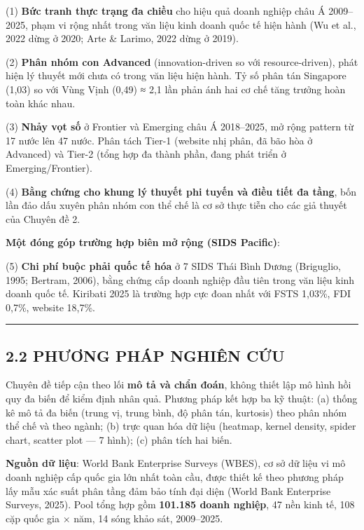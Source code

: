 \documentclass[12pt,a4paper]{article}
\begin{document}
(1) \textbf{Bức tranh thực trạng đa chiều} cho hiệu quả doanh nghiệp
châu Á 2009--2025, phạm vi rộng nhất trong văn liệu kinh doanh quốc tế
hiện hành (Wu et al., 2022 dừng ở 2020; Arte \& Larimo, 2022 dừng ở
2019).

(2) \textbf{Phân nhóm con Advanced} (innovation-driven so với
resource-driven), phát hiện lý thuyết mới chưa có trong văn liệu hiện
hành. Tỷ số phân tán Singapore (1,03) so với Vùng Vịnh (0,49) ≈ 2,1 lần
phản ánh hai cơ chế tăng trưởng hoàn toàn khác nhau.

(3) \textbf{Nhảy vọt số} ở Frontier và Emerging châu Á 2018--2025, mở
rộng pattern từ 17 nước lên 47 nước. Phân tách Tier-1 (website nhị phân,
đã bão hòa ở Advanced) và Tier-2 (tổng hợp đa thành phần, đang phát
triển ở Emerging/Frontier).

(4) \textbf{Bằng chứng cho khung lý thuyết phi tuyến và điều tiết đa
tầng}, bốn lần đảo dấu xuyên phân nhóm con thể chế là cơ sở thực tiễn
cho các giả thuyết của Chuyên đề 2.

\textbf{Một đóng góp trường hợp biên mở rộng (SIDS Pacific)}:

(5) \textbf{Chi phí buộc phải quốc tế hóa} ở 7 SIDS Thái Bình Dương
(Briguglio, 1995; Bertram, 2006), bằng chứng cấp doanh nghiệp đầu tiên
trong văn liệu kinh doanh quốc tế. Kiribati 2025 là trường hợp cực đoan
nhất với FSTS 1,03\%, FDI 0,7\%, website 18,7\%.

\begin{center}\rule{0.5\linewidth}{0.5pt}\end{center}

\hypertarget{22-phux1b0ux1a1ng-phuxe1p-nghiuxean-cux1ee9u}{%
\subsection{2.2 PHƯƠNG PHÁP NGHIÊN
CỨU}\label{22-phux1b0ux1a1ng-phuxe1p-nghiuxean-cux1ee9u}}

Chuyên đề tiếp cận theo lối \textbf{mô tả và chẩn đoán}, không thiết lập
mô hình hồi quy đa biến để kiểm định nhân quả. Phương pháp kết hợp ba kỹ
thuật: (a) thống kê mô tả đa biến (trung vị, trung bình, độ phân tán,
kurtosis) theo phân nhóm thể chế và theo ngành; (b) trực quan hóa dữ
liệu (heatmap, kernel density, spider chart, scatter plot --- 7 hình);
(c) phân tích hai biến.

\textbf{Nguồn dữ liệu}: World Bank Enterprise Surveys (WBES), cơ sở dữ
liệu vi mô doanh nghiệp cấp quốc gia lớn nhất toàn cầu, được thiết kế
theo phương pháp lấy mẫu xác suất phân tầng đảm bảo tính đại diện (World
Bank Enterprise Surveys, 2025). Pool tổng hợp gồm \textbf{101.185 doanh
nghiệp}, 47 nền kinh tế, 108 cặp quốc gia × năm, 14 sóng khảo sát,
2009--2025.
\end{document}
